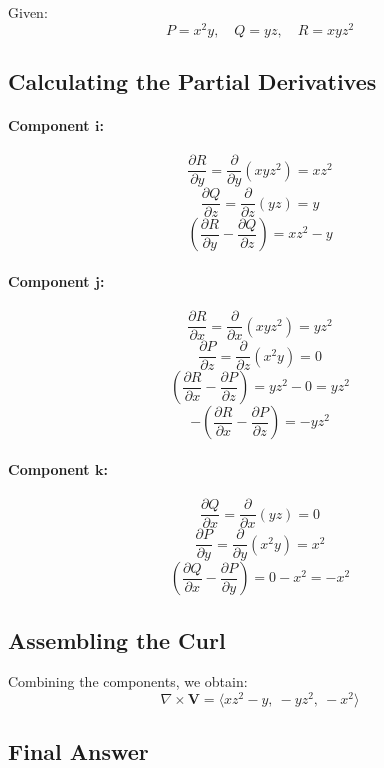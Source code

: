 \documentclass[11pt]{article}
\begin{document}
Given:
\[
P = x^2 y, \quad Q = y z, \quad R = x y z^2
\]

\newpage

\subsection{Calculating the Partial Derivatives}

\paragraph{Component \( \mathbf{i} \):}
\[
\frac{\partial R}{\partial y} = \frac{\partial}{\partial y} (x y z^2) = x z^2
\]
\[
\frac{\partial Q}{\partial z} = \frac{\partial}{\partial z} (y z) = y
\]
\[
\left( \frac{\partial R}{\partial y} - \frac{\partial Q}{\partial z} \right) = x z^2 - y
\]

\paragraph{Component \( \mathbf{j} \):}
\[
\frac{\partial R}{\partial x} = \frac{\partial}{\partial x} (x y z^2) = y z^2
\]
\[
\frac{\partial P}{\partial z} = \frac{\partial}{\partial z} (x^2 y) = 0
\]
\[
\left( \frac{\partial R}{\partial x} - \frac{\partial P}{\partial z} \right) = y z^2 - 0 = y z^2
\]
\[
- \left( \frac{\partial R}{\partial x} - \frac{\partial P}{\partial z} \right) = - y z^2
\]

\paragraph{Component \( \mathbf{k} \):}
\[
\frac{\partial Q}{\partial x} = \frac{\partial}{\partial x} (y z) = 0
\]
\[
\frac{\partial P}{\partial y} = \frac{\partial}{\partial y} (x^2 y) = x^2
\]
\[
\left( \frac{\partial Q}{\partial x} - \frac{\partial P}{\partial y} \right) = 0 - x^2 = -x^2
\]

\newpage

\subsection{Assembling the Curl}

Combining the components, we obtain:
\[
\nabla \times \mathbf{V} = \langle x z^2 - y, \ - y z^2, \ -x^2 \rangle
\]

\newpage

\subsection{Final Answer}
\end{document}
